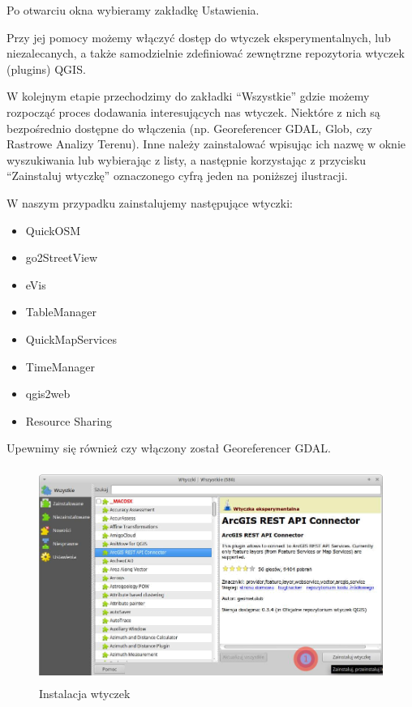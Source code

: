\documentclass[12pt,a4paper]{book}
\begin{document}
Po otwarciu okna wybieramy zakładkę Ustawienia.

Przy jej pomocy możemy włączyć dostęp do wtyczek eksperymentalnych, lub niezalecanych, a także samodzielnie zdefiniować zewnętrzne repozytoria wtyczek (plugins) QGIS.

W kolejnym etapie przechodzimy do zakładki ``Wszystkie'' gdzie możemy rozpocząć proces dodawania interesujących nas wtyczek. Niektóre z nich są bezpośrednio dostępne do włączenia (np. Georeferencer GDAL, Glob, czy Rastrowe Analizy Terenu). Inne należy zainstalować wpisując ich nazwę w oknie wyszukiwania lub wybierając z listy, a następnie korzystając z przycisku ``Zainstaluj wtyczkę'' oznaczonego cyfrą jeden na poniższej ilustracji.

W naszym przypadku zainstalujemy następujące wtyczki:

\begin{center}
\begin{itemize}
\item QuickOSM
\item go2StreetView
\item eVis
\item TableManager
\item QuickMapServices
\item TimeManager
\item qgis2web
\item Resource Sharing
\end{itemize}
\end{center}
Upewnimy się również czy włączony został Georeferencer GDAL.

\begin{figure}[ht]
	\centering
	\includegraphics[height=7cm]{002-wtyczki-instalacja.png}
	\caption{Instalacja wtyczek}
\end{figure}
\end{document}
